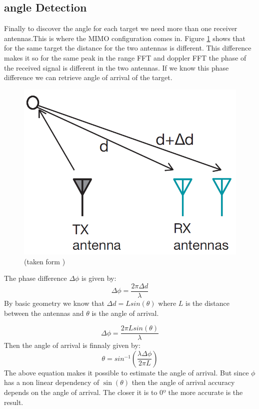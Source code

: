 \subsection*{angle Detection}
Finally to discover the angle for each target we need more than one receiver antennas.This is where the \ac{MIMO} configuration comes in. Figure \ref{fig:angle} shows that for the same target the distance for the two antennas is different.  This difference makes it so for the same peak in the range \ac{FFT} and doppler \ac{FFT} the phase of the received signal is different in the two antennas. If we know this phase difference we can retrieve angle of arrival of the target. 
\begin{figure}[h] 
\centerline{\includegraphics [width=0.5 \textwidth]{imgs/chapter2/angle.png}}
\caption{(taken form \cite{iovescu2017fundamentals})}
\label{fig:angle}
\end{figure}
The phase difference $\Delta \phi$ is given by:
\begin{equation}
    \Delta \phi=\frac{2 \pi \Delta d}{\lambda}
\end{equation}
By basic geometry we know that $\Delta d =L sin(\theta)$ where $L$ is the distance between the antennas and $\theta$ is the angle of arrival. 

\begin{equation}
    \Delta \phi=\frac{2 \pi L sin(\theta)}{\lambda}
\end{equation}
Then the angle of arrival is finnaly given by:
\begin{equation}
    \theta = sin^{-1}(\frac{\lambda \Delta \phi}{2 \pi L})
\end{equation}
The above equation makes it possible to estimate the angle of arrival. But since $\phi$ has a non linear dependency of $\sin(\theta)$ then the angle of arrival accuracy depends on the angle of arrival. The closer it is to $0º$ the more accurate is the result.

 
